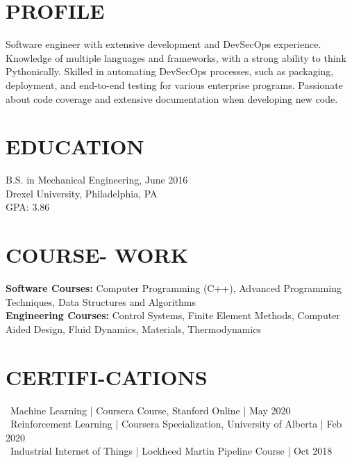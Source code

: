 \documentclass[line,resmargin,11pt]{res}
\begin{document}
\begin{resume}

\section{PROFILE}
Software engineer with extensive development and DevSecOps experience. Knowledge of multiple languages and frameworks, with a strong ability to think Pythonically. Skilled in automating DevSecOps processes, such as packaging, deployment, and end-to-end testing for various enterprise programs. Passionate about code coverage and extensive documentation when developing new code.
 
\section{EDUCATION}
B.S. in Mechanical Engineering, June 2016 \\
Drexel University, Philadelphia, PA \\
GPA: 3.86 
\section{COURSE- WORK}
				\textbf{Software Courses:} Computer Programming (C++), Advanced Programming Techniques, Data Structures and Algorithms \\
				\textbf{Engineering Courses:} Control Systems, Finite Element Methods, Computer Aided Design, Fluid Dynamics, Materials, Thermodynamics

\section{CERTIFI-CATIONS}
	\textbullet\ Machine Learning | Coursera Course, Stanford Online | May 2020 \\
	\textbullet\ Reinforcement Learning | Coursera Specialization, University of Alberta | Feb 2020 \\
	\textbullet\ Industrial Internet of Things | Lockheed Martin Pipeline Course | Oct 2018


\end{resume}
\end{document}
